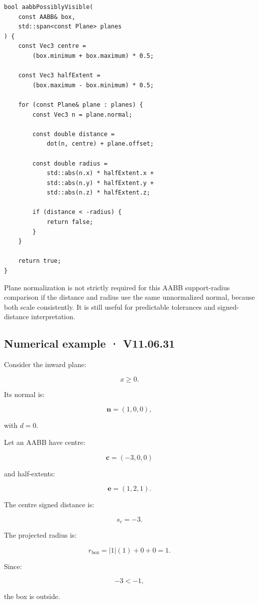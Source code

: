 \begin{verbatim}
bool aabbPossiblyVisible(
    const AABB& box,
    std::span<const Plane> planes
) {
    const Vec3 centre =
        (box.minimum + box.maximum) * 0.5;

    const Vec3 halfExtent =
        (box.maximum - box.minimum) * 0.5;

    for (const Plane& plane : planes) {
        const Vec3 n = plane.normal;

        const double distance =
            dot(n, centre) + plane.offset;

        const double radius =
            std::abs(n.x) * halfExtent.x +
            std::abs(n.y) * halfExtent.y +
            std::abs(n.z) * halfExtent.z;

        if (distance < -radius) {
            return false;
        }
    }

    return true;
}
\end{verbatim}

Plane normalization is not strictly required for this AABB support-radius comparison if the distance and radius use the same unnormalized normal, because both scale consistently. It is still useful for predictable tolerances and signed-distance interpretation.

\subsection{Numerical example · V11.06.31}\label{02-foundations-ii-ch034-numerical-example-v11.06.31}

Consider the inward plane:

\[
 x\ge0.
\]

Its normal is:

\[
 \mathbf n=(1,0,0),
\]

with \(d=0\).

Let an AABB have centre:

\[
 \mathbf c=(-3,0,0)
\]

and half-extents:

\[
 \mathbf e=(1,2,1).
\]

The centre signed distance is:

\[
 s_c=-3.
\]

The projected radius is:

\[
 r_{\mathrm{box}}= |1|(1)+0+0=1.
\]

Since:

\[
 -3<-1,
\]

the box is outside.

